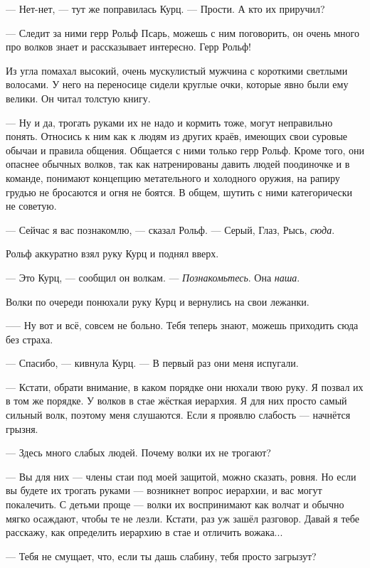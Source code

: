 --- Нет-нет, --- тут же поправилась Курц.
--- Прости.
А кто их приручил?

--- Следит за ними герр Рольф Псарь, можешь с ним поговорить, он очень много про волков знает и рассказывает интересно.
Герр Рольф!

Из угла помахал высокий, очень мускулистый мужчина с короткими светлыми волосами.
У него на переносице сидели круглые очки, которые явно были ему велики.
Он читал толстую книгу.

--- Ну и да, трогать руками их не надо и кормить тоже, могут неправильно понять.
Относись к ним как к людям из других краёв, имеющих свои суровые обычаи и правила общения.
Общается с ними только герр Рольф.
Кроме того, они опаснее обычных волков, так как натренированы давить людей поодиночке и в команде, понимают концепцию метательного и холодного оружия, на рапиру грудью не бросаются и огня не боятся.
В общем, шутить с ними категорически не советую.

\asterism

--- Сейчас я вас познакомлю, --- сказал Рольф.
--- Серый, Глаз, Рысь, \textit{сюда}.

Рольф аккуратно взял руку Курц и поднял вверх.

--- Это Курц, --- сообщил он волкам.
--- \textit{Познакомьтесь}.
Она \textit{наша}.

Волки по очереди понюхали руку Курц и вернулись на свои лежанки.

--— Ну вот и всё, совсем не больно.
Тебя теперь знают, можешь приходить сюда без страха.

--- Спасибо, --- кивнула Курц.
--- В первый раз они меня испугали.

--- Кстати, обрати внимание, в каком порядке они нюхали твою руку.
Я позвал их в том же порядке.
У волков в стае жёсткая иерархия.
Я для них просто самый сильный волк, поэтому меня слушаются.
Если я проявлю слабость --- начнётся грызня.

--- Здесь много слабых людей.
Почему волки их не трогают?

--- Вы для них --- члены стаи под моей защитой, можно сказать, ровня.
Но если вы будете их трогать руками --- возникнет вопрос иерархии, и вас могут покалечить.
С детьми проще --- волки их воспринимают как волчат и обычно мягко осаждают, чтобы те не лезли.
Кстати, раз уж зашёл разговор.
Давай я тебе расскажу, как определить иерархию в стае и отличить вожака...

\asterism

--- Тебя не смущает, что, если ты дашь слабину, тебя просто загрызут?

